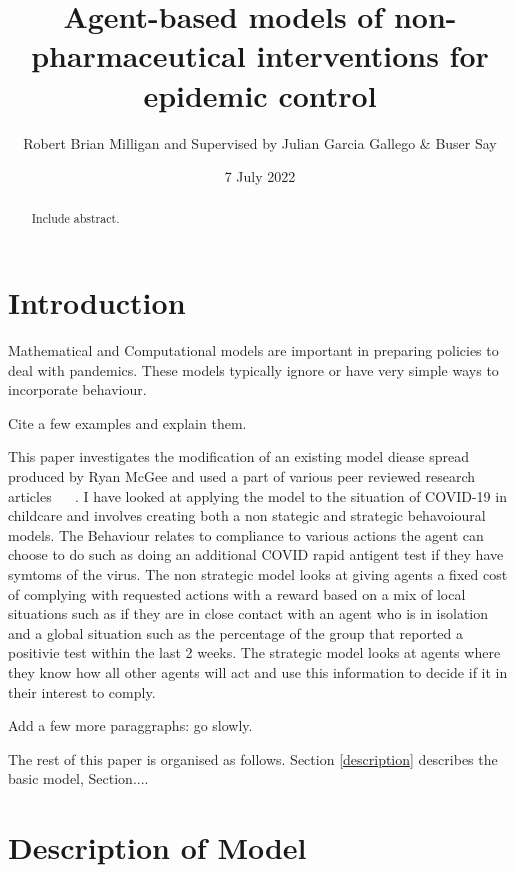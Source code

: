 \documentclass{article}
\title{Agent-based models of non-pharmaceutical interventions for epidemic control}
\author{Robert Brian Milligan and Supervised by Julian Garcia Gallego \& Buser Say}
\date{7 July 2022}
\begin{document}
\maketitle

\begin{abstract}
	Include abstract.
\end{abstract}



\tableofcontents

\newpage 

\section{Introduction}

Mathematical and Computational models are important in preparing policies to deal with pandemics.
These models typically ignore or have very simple ways to incorporate behaviour.

Cite a few examples and explain them. 

This paper investigates the modification of an existing model diease spread produced by Ryan McGee and used a part of various peer reviewed research articles ~\cite{mcgee_homburger_williams_bergstrom_zhou_2021} ~\cite{mcgee_homburger_williams_bergstrom_zhou_2021_2}. 
I have looked at applying the model to the situation of COVID-19 in childcare and involves creating both a non stategic and strategic behavoioural models. 
The Behaviour relates to compliance to various actions the agent can choose to do such as doing an additional COVID rapid antigent test if they have symtoms of the virus. The non strategic model looks at giving agents a fixed cost of complying with requested actions with a reward based on a mix of local situations such as if they are in close contact with an agent who is in isolation and a global situation such as the percentage of the group that reported a positivie test within the last 2 weeks. The strategic model looks at agents where they know how all other agents will act and use this information to decide if it in their interest to comply.

Add a few more paraggraphs: go slowly.


The rest of this paper is organised as follows. Section \ref{description} describes the basic model, Section....



\section{Description of Model \label{description}}
\end{document}
